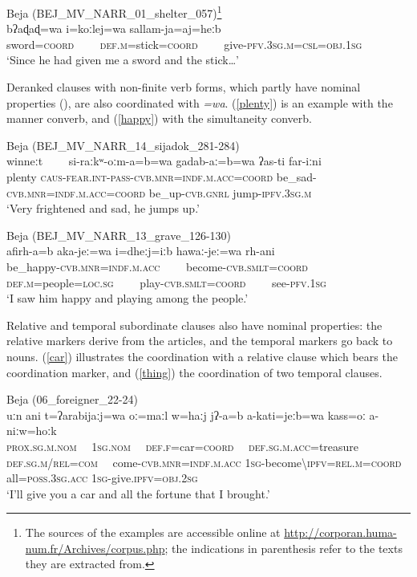 \documentclass[output=paper]{langsci/langscibook}
\begin{document}
\ea \label{sword}
{Beja (BEJ\_MV\_NARR\_01\_shelter\_057)\footnote{The sources of the examples are accessible online at \url{http://corporan.huma-num.fr/Archives/corpus.php}; the indications in parenthesis refer to the texts they are extracted from.}}\\
\gll bʔaɖaɖ=wa i=koːlej=wa sallam-ja=aj=heːb\\
     sword=\textsc{coord}~~~~ \textsc{def.m}=stick=\textsc{coord}~~~~ give-\textsc{pfv.3sg.m=csl=obj.1sg}\\
\glt `Since he had given me a sword and the stick…'
\z

Deranked clauses with non-finite verb forms, which partly have nominal properties (\citealt{Vanhove2016}), are also coordinated with \textit{=wa}. (\ref{plenty}) is an example with the manner converb, and (\ref{happy}) with the simultaneity converb. 

\ea\label{plenty}
{Beja (BEJ\_MV\_NARR\_14\_sijadok\_281-284)}\\
\gll winneːt~~~~ si-raːkʷ-oːm-a=b=wa gadab-aː=b=wa  ʔas-ti far-iːni\\
     plenty \textsc{caus}{}-\textsc{\textup{fear}}.\textsc{int-pass-cvb.mnr=indf.m.acc=coord} be\_sad-\textsc{cvb.mnr=indf.m.acc=coord} be\_up-\textsc{cvb.gnrl} jump-\textsc{ipfv.3sg.m}\\
\glt `Very frightened and sad, he jumps up.'
\z

\ea\label{happy}
{Beja (BEJ\_MV\_NARR\_13\_grave\_126-130)}\\
\gll afirh-a=b aka-jeː=wa i=dheːj=iːb hawaː-jeː=wa rh-ani\\
     be\_happy-\textsc{cvb.mnr=indf.m.acc}~~~~ become-\textsc{cvb.smlt=coord} \textsc{def.m}=people=\textsc{loc.sg}~~~~ play-\textsc{cvb.smlt=coord}~~~~ see-\textsc{pfv.1sg}\\
\glt `I saw him happy and playing among the people.'
\z

{Relative and temporal subordinate clauses also have nominal properties: the relative markers derive from the articles, and the temporal markers go back to nouns. (\ref{car}) illustrates the coordination with a relative clause which bears the} {coordination marker, and (\ref{thing}) the coordination of two temporal clauses.}

\ea\label{car}
{{Beja}{ (}{06\_foreigner\_22-24)}}\\
\gll uːn ani t=ʔarabijaːj=wa oː=maːl w=haːj jʔ-a=b a-kati=jeːb=wa kass=oː  a-niːw=hoːk\\
     \textsc{prox.sg.m.nom}~~	\textsc{1sg.nom}~~ \textsc{def.f=}car=\textsc{coord}~~ \textsc{def.sg.m.acc=}treasure \textsc{def.sg.m/rel=com}~~ come-\textsc{cvb.mnr=indf.m.acc} \textsc{1sg}-become\textsc{\textbackslash ipfv=rel.m=coord} all=\textsc{poss.3sg.acc} \textsc{1sg}-give.\textsc{ipfv=obj.2sg}\\
\glt `I’ll give you a car and all the fortune that I brought.'
\z
\end{document}
